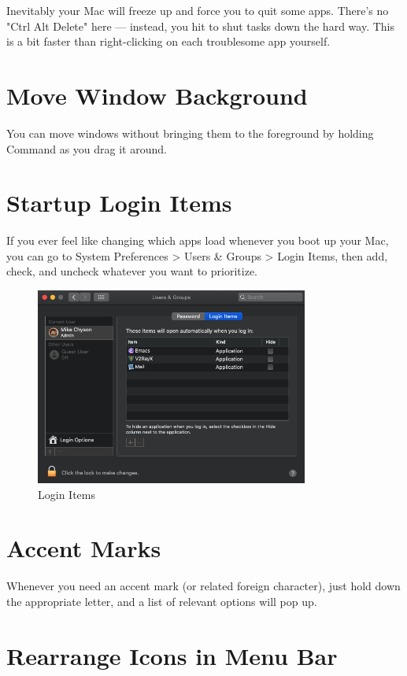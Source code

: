 Inevitably your Mac will freeze up and force you to quit some apps.
There's no "Ctrl Alt Delete" here — instead, you hit  to shut tasks down the hard way.
This is a bit faster than right-clicking on each troublesome app yourself.


\section{Move Window Background}

You can move windows without bringing them to the foreground by holding Command as you drag it around.


\section{Startup Login Items}

If you ever feel like changing which apps load whenever you boot up your Mac, you can go to System Preferences > Users \& Groups > Login Items, then add, check, and uncheck whatever you want to prioritize.


\begin{figure}[H]
  \centering
  \includegraphics[width=0.8\textwidth]{login-items.png}
  \caption{Login Items}
\end{figure}


\section{Accent Marks}

Whenever you need an accent mark (or related foreign character), just hold down the appropriate letter, and a list of relevant options will pop up.

\section{Rearrange Icons in Menu Bar}

